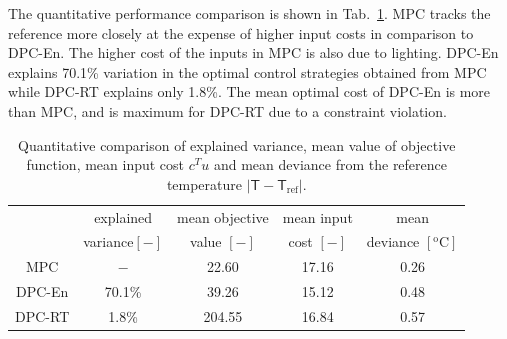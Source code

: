 The quantitative performance comparison is shown in Tab.~\ref{T:comparison}. MPC tracks the reference more closely at the expense of higher input costs in comparison to DPC-En. The higher cost of the inputs in MPC is also due to lighting. DPC-En explains 70.1\% variation in the optimal control strategies obtained from MPC while DPC-RT explains only 1.8\%. The mean optimal cost of DPC-En is more than MPC, and is maximum for DPC-RT due to a constraint violation.

\begin{table}[h!]
	\centering
	\begin{tabular}{ccccc}
		\toprule
		& explained & mean objective& mean input  & mean  \\
		&  variance$[\mathrm{-}]$ & value $[\mathrm{-}]$ & cost $[-]$ & deviance $[\mathrm{^oC}]$ \\     
		\midrule
		MPC    &  $\mathrm{-}$ &  22.60 & 17.16  &  0.26  \\
		DPC-En   & 70.1\% &  39.26  & 15.12 &  0.48 \\
		DPC-RT  & 1.8\% & 204.55 & 16.84 &  0.57 \\
		\bottomrule
	\end{tabular}
	\caption{Quantitative comparison of explained variance, mean value of objective function, mean input cost $c^Tu$ and mean deviance from the reference temperature $|\mathsf{T}-\mathsf{T}_{\mathrm{ref}}|$.}
	\captionsetup{justification=centering}
	\label{T:comparison}
\end{table}

